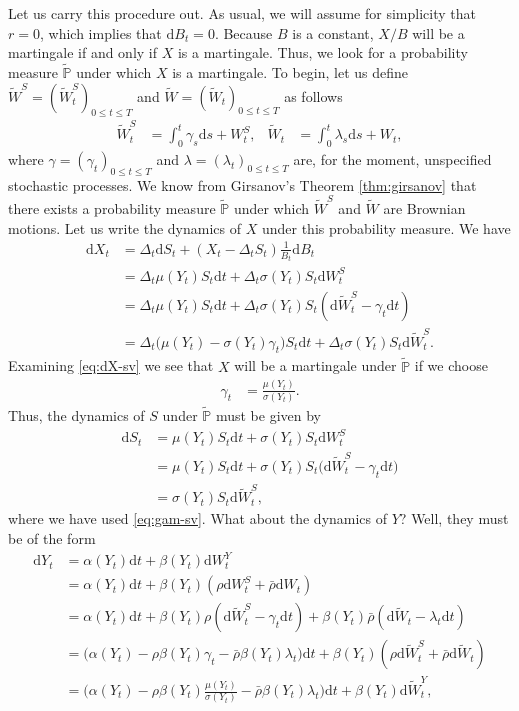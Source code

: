 \documentclass[12pt]{book}
\numberwithin{equation}{chapter}
\theoremstyle{plain}
\numberwithin{theorem}{section}
\theoremstyle{definition}
\numberwithin{exercise}{chapter}
\newcommand{\<}{\langle}
\renewcommand{\>}{\rangle}
\renewcommand{\(}{\left(}
\renewcommand{\)}{\right)}
\renewcommand{\[}{\left[}
\renewcommand{\]}{\right]}
\newcommand\Pb{\mathds{P}}
\newcommand\sig{\sigma}
\newcommand\gam{\gamma}
\newcommand\lam{\lambda}
\newcommand\Del{\Delta}
\newcommand\rhob{\bar{\rho}}
\newcommand\Pbt{\widetilde{\Pb}}
\newcommand\Wt{\widetilde{W}}
\newcommand\dd{\mathrm{d}}
\theoremstyle{definition}
\numberwithin{question}{section}
\begin{document}
\noindent
Let us carry this procedure out.  As usual, we will assume for simplicity that $r=0$, which implies that $\dd B_t = 0$.  Because $B$ is a constant, $X/B$ will be a martingale if and only if $X$ is a martingale.  Thus, we look for a probability measure $\Pbt$ under which $X$ is a martingale.  To begin, let us define $\Wt^S = (\Wt_t^S)_{0 \leq t \leq T}$ and $\Wt = (\Wt_t)_{0 \leq t \leq T}$ as follows
\begin{align}
\Wt_t^S
	&=	\int_0^t \gam_s \dd s  + W_t^S , &
\Wt_t
	&=	\int_0^t \lam_s \dd s + W_t ,
\end{align}
where $\gam = (\gam_t)_{0 \leq t \leq T}$ and $\lam = (\lam_t)_{0 \leq t \leq T}$ are, for the moment, unspecified stochastic processes.
We know from Girsanov's Theorem \ref{thm:girsanov} that there exists a probability measure $\Pbt$ under which $\Wt^S$ and $\Wt$ are Brownian motions.  Let us write the dynamics of $X$ under this probability measure.  We have
\begin{align}
\dd X_t
	&=	\Del_t \dd S_t + (X_t - \Del_t S_t) \frac{1}{B_t} \dd B_t \\
	&=	\Del_t \mu(Y_t) S_t \dd t + \Del_t \sig(Y_t) S_t \dd W_t^S \\
	&=	\Del_t \mu(Y_t) S_t \dd t + \Del_t \sig(Y_t) S_t ( \dd \Wt_t^S - \gam_t \dd t ) \\
	&=	\Del_t \big( \mu(Y_t) - \sig(Y_t) \gam_t \big) S_t \dd t + \Del_t \sig(Y_t) S_t \dd \Wt_t^S . \label{eq:dX-sv}
\end{align}
Examining \eqref{eq:dX-sv} we see that $X$ will be a martingale under $\Pbt$ if we choose
\begin{align}
\gam_t
	&=	\frac{ \mu(Y_t) }{\sig(Y_t)} . \label{eq:gam-sv}
\end{align}
Thus, the dynamics of $S$ under $\Pbt$ must be given by
\begin{align}
\dd S_t 
	&= \mu(Y_t) S_t \dd t + \sigma(Y_t) S_t \dd W_t^S \\
	&=	\mu(Y_t) S_t \dd t + \sigma(Y_t) S_t \big( \dd \Wt_t^S - \gam_t \dd t \big) \\
	&=	\sigma(Y_t) S_t \dd \Wt_t^S , \label{eq:dS-rn}
\end{align}
where we have used \eqref{eq:gam-sv}.  What about the dynamics of $Y$?  Well, they must be of the form
\begin{align}
\dd Y_t
	&=	\alpha(Y_t) \dd t + \beta(Y_t) \dd W_t^Y \\
	&=	\alpha(Y_t) \dd t + \beta(Y_t) ( \rho \dd W_t^S + \rhob \dd W_t ) \\
	&=	\alpha(Y_t) \dd t + \beta(Y_t) \rho ( \dd \Wt_t^S - \gam_t \dd t)  + \beta(Y_t) \rhob ( \dd \Wt_t  - \lam_t \dd t) \\
	&=	\big( \alpha(Y_t) - \rho \beta(Y_t) \gam_t - \rhob \beta(Y_t) \lam_t \big) \dd t + \beta(Y_t) ( \rho \dd \Wt_t^S + \rhob \dd \Wt_t )  \\
	&=	\big( \alpha(Y_t) - \rho \beta(Y_t) \frac{ \mu(Y_t) }{\sig(Y_t)} - \rhob \beta(Y_t) \lam_t \big) \dd t + \beta(Y_t) \dd \Wt_t^Y ,
\end{align}
\end{document}
